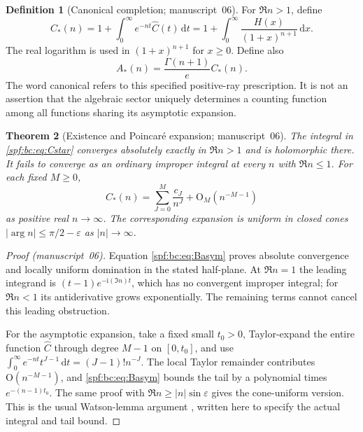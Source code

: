 \documentclass[11pt]{article}
\numberwithin{equation}{section}
\newtheorem{theorem}{Theorem}[section]
\theoremstyle{definition}
\newtheorem{definition}[theorem]{Definition}
\theoremstyle{remark}
\theoremstyle{definition}
\newcommand{\bigO}{\mathrm O}
\newcommand{\bcC}{C_{\!*}}
\newcommand{\bcA}{A_{\!*}}
\begin{document}
\begin{definition}[Canonical completion; manuscript~06]
For $\Re n>1$, define
\begin{equation}
 \boxed{\bcC(n)=1+\int_0^\infty e^{-nt}\widehat C(t)\,\mathrm d t
       =1+\int_0^\infty\frac{H(x)}{(1+x)^{n+1}}\,\mathrm d x.}
 \label{spf:bc:eq:Cstar}
\end{equation}
The real logarithm is used in $(1+x)^{n+1}$ for $x\ge0$. Define also
\begin{equation}
 \bcA(n)=\frac{\Gamma(n+1)}{e}\bcC(n).
 \label{spf:bc:eq:Astar}
\end{equation}
The word canonical refers to this specified positive-ray prescription. It
is not an assertion that the algebraic sector uniquely determines a counting
function among all functions sharing its asymptotic expansion.
\end{definition}

\begin{theorem}[Existence and Poincar\'e expansion; manuscript~06]
\label{spf:bc:thm:sum}
The integral in \eqref{spf:bc:eq:Cstar} converges absolutely exactly in
$\Re n>1$ and is holomorphic there. It fails to converge as an ordinary
improper integral at every $n$ with $\Re n\le1$. For each fixed $M\ge0$,
\begin{equation}
 \bcC(n)=\sum_{J=0}^M\frac{c_J}{n^J}+\bigO_M(n^{-M-1})
 \label{spf:bc:eq:Cstar-asym}
\end{equation}
as positive real $n\to\infty$. The corresponding expansion is uniform in
closed cones $|\arg n|\le\pi/2-\varepsilon$ as $|n|\to\infty$.
\end{theorem}
\begin{proof}[Proof (manuscript~06)]
Equation \eqref{spf:bc:eq:Basym} proves absolute convergence and locally uniform
domination in the stated half-plane. At $\Re n=1$ the leading integrand is
$(t-1)e^{-\mathrm i(\Im n)t}$, which has no convergent improper integral;
for $\Re n<1$ its antiderivative grows exponentially. The remaining terms
cannot cancel this leading obstruction.

For the asymptotic expansion, take a fixed small $t_0>0$, Taylor-expand the
entire function $\widehat C$ through degree $M-1$ on $[0,t_0]$, and use
$\int_0^\infty e^{-nt}t^{J-1}\,\mathrm d t=(J-1)!n^{-J}$.
The local Taylor remainder contributes $\bigO(n^{-M-1})$, and
\eqref{spf:bc:eq:Basym} bounds the tail by a polynomial times
$e^{-(n-1)t_0}$. The same proof with $\Re n\ge |n|\sin\varepsilon$
gives the cone-uniform version. This is the usual Watson-lemma argument
\cite{bcDlmfWatson}, written here to specify the actual integral and tail bound.
\end{proof}
\end{document}
